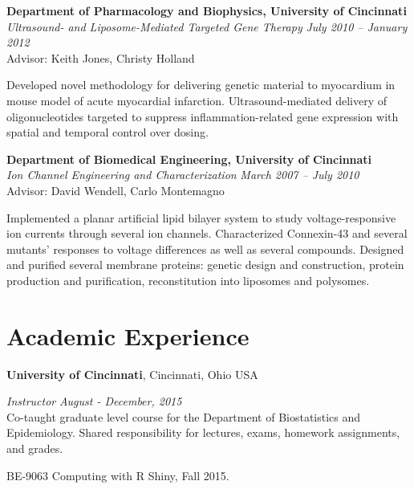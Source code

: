 \documentclass[margin,line]{res}
\newenvironment{list1}{
  \begin{list}{\ding{113}}{%
      \setlength{\itemsep}{0in}
      \setlength{\parsep}{0in} \setlength{\parskip}{0in}
      \setlength{\topsep}{0in} \setlength{\partopsep}{0in} 
      \setlength{\leftmargin}{0.17in}}}{\end{list}}
\newenvironment{list2}{
  \begin{list}{}{%
      \setlength{\itemsep}{0in}
      \setlength{\parsep}{0in} \setlength{\parskip}{0in}
      \setlength{\topsep}{0in} \setlength{\partopsep}{0in} 
      \setlength{\leftmargin}{0.4in}}}{\end{list}}
\begin{document}
\begin{resume}
 
\textbf{Department of Pharmacology and Biophysics, University of Cincinnati} \\

\vspace{-0.2in}
\textsl{Ultrasound- and Liposome-Mediated Targeted Gene Therapy}
\hfill \textit{July 2010 -- January 2012} \\
Advisor: Keith Jones, Christy Holland \\
\vspace{-0.13in}
\begin{list1}
\item[] Developed novel methodology for delivering genetic material to myocardium in mouse model of acute myocardial infarction. Ultrasound-mediated delivery of oligonucleotides targeted to suppress inflammation-related gene expression with spatial and temporal control over dosing.
\end{list1}


\textbf{Department of Biomedical Engineering, University of Cincinnati}\\

\vspace{-0.2in}
\textsl{Ion Channel Engineering and Characterization}
\hfill \textit{March 2007 -- July 2010} \\ 
Advisor: David Wendell, Carlo Montemagno \\
\vspace{-0.13in}
\begin{list1}
\item[] Implemented a planar artificial lipid bilayer system to study voltage-responsive ion currents through several ion channels. Characterized Connexin-43 and several mutants' responses to voltage differences as well as several compounds. Designed and purified several membrane proteins: genetic design and construction, protein production and purification, reconstitution into liposomes and polysomes.
\end{list1}

\section{\sc Academic Experience}
{\bf University of Cincinnati}, Cincinnati, Ohio USA

{\em Instructor} \hfill \textit{August - December, 2015}\\
Co-taught graduate level course for the Department of Biostatistics and Epidemiology.  Shared responsibility for lectures, exams,
homework assignments, and  grades.  
\vspace*{.05in}  
\begin{list2}
\item BE-9063 Computing with R Shiny, Fall 2015.
\end{list2}




\end{resume}
\end{document}
